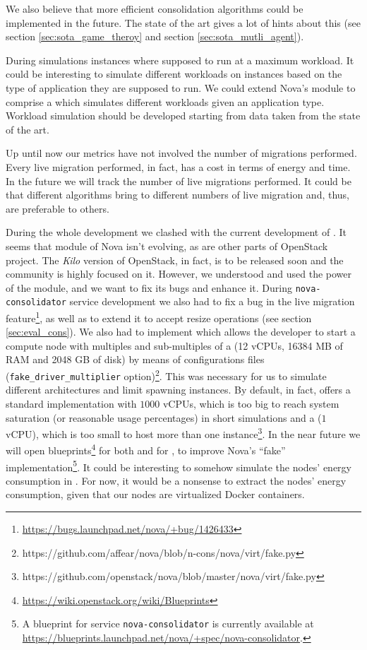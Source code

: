 We also believe that more efficient consolidation algorithms could be implemented in the future. The state of the art gives a lot of hints about this (see section \ref{sec:sota_game_theroy} and section \ref{sec:sota_mutli_agent}). 

During simulations instances where supposed to run at a maximum workload. It could be interesting to simulate different workloads on instances based on the type of application they are supposed to run. We could extend Nova's  module to comprise a  which simulates different workloads given an application type. Workload simulation should be developed starting from data taken from the state of the art.

Up until now our metrics have not involved the number of migrations performed. Every live migration performed, in fact, has a cost in terms of energy and time. In the future we will track the number of live migrations performed. It could be that different algorithms bring to different numbers of live migration and, thus, are preferable to others.

During the whole development we clashed with the current development of . It seems that  module of Nova isn't evolving, as are other parts of OpenStack project. The \emph{Kilo} version of OpenStack, in fact, is to be released soon and the community is highly focused on it. However, we understood and used the power of the  module, and we want to fix its bugs and enhance it. During \texttt{nova-consolidator} service development we also had to fix a bug in the live migration feature\footnote{\url{https://bugs.launchpad.net/nova/+bug/1426433}}, as well as to extend it to accept resize operations (see section \ref{sec:eval_cons}). We also had to implement  which allows the developer to start a compute node with multiples and sub-multiples of a  (12 vCPUs, 16384 MB of RAM and 2048 GB of disk) by means of configurations files (\texttt{fake\_driver\_multiplier} option)\footnote{https://github.com/affear/nova/blob/n-cons/nova/virt/fake.py}. This was necessary for us to simulate different architectures and limit spawning instances. By default, in fact,  offers a standard implementation with $1000$ vCPUs, which is too big to reach system saturation (or reasonable usage percentages) in short simulations and a  ($1$ vCPU), which is too small to host more than one instance\footnote{https://github.com/openstack/nova/blob/master/nova/virt/fake.py}. In the near future we will open blueprints\footnote{\url{https://wiki.openstack.org/wiki/Blueprints}} for both  and for , to improve Nova's ``fake'' implementation\footnote{A blueprint for service \texttt{nova-consolidator} is currently available at \url{https://blueprints.launchpad.net/nova/+spec/nova-consolidator}.}. It could be interesting to somehow simulate the nodes' energy consumption in . For now, it would be a nonsense to extract the nodes' energy consumption, given that our nodes are virtualized Docker containers.


